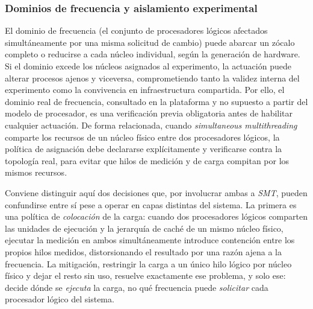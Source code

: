 \documentclass[12pt,oneside,spanish]{book}
\begin{document}
\subsubsection{Dominios de frecuencia y aislamiento experimental}
\label{sec:dominios}

El dominio de frecuencia (el conjunto de procesadores lógicos afectados simultáneamente por una misma solicitud de cambio) puede abarcar un zócalo completo o reducirse a cada núcleo individual, según la generación de hardware. Si el dominio excede los núcleos asignados al experimento, la actuación puede alterar procesos ajenos y viceversa, comprometiendo tanto la validez interna del experimento como la convivencia en infraestructura compartida. Por ello, el dominio real de frecuencia, consultado en la plataforma y no supuesto a partir del modelo de procesador, es una verificación previa obligatoria antes de habilitar cualquier actuación. De forma relacionada, cuando \textit{simultaneous multithreading} comparte los recursos de un núcleo físico entre dos procesadores lógicos, la política de asignación debe declararse explícitamente y verificarse contra la topología real, para evitar que hilos de medición y de carga compitan por los mismos recursos.

Conviene distinguir aquí dos decisiones que, por involucrar ambas a \textit{SMT}, pueden confundirse entre sí pese a operar en capas distintas del sistema. La primera es una política de \emph{colocación} de la carga: cuando dos procesadores lógicos comparten las unidades de ejecución y la jerarquía de caché de un mismo núcleo físico, ejecutar la medición en ambos simultáneamente introduce contención entre los propios hilos medidos, distorsionando el resultado por una razón ajena a la frecuencia. La mitigación, restringir la carga a un único hilo lógico por núcleo físico y dejar el resto sin uso, resuelve exactamente ese problema, y solo ese: decide dónde se \emph{ejecuta} la carga, no qué frecuencia puede \emph{solicitar} cada procesador lógico del sistema.
\end{document}
